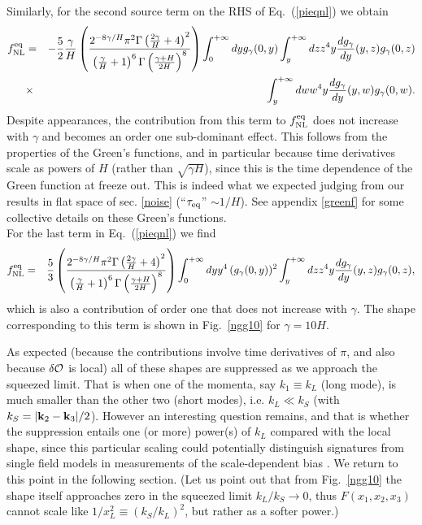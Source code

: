 \documentclass[11pt,amsmath,floats,floatfix,nofootinbib,secnumarabic, superscriptaddress, tightenlines]{revtex4}
\newcommand{\lp}{\left(}
\newcommand{\rp}{\right)}
\begin{document}
{Similarly, for the second source term on the RHS of Eq.~(\ref{pieqnl}) we obtain
\begin{eqnarray}
f_{\rm NL}^{\rm eq}&=&-\frac{5}{2}\frac{\gamma}{H}\left(\frac{2^{-8\gamma/H}\pi^2 {\Gamma\left(\frac{2\gamma}{H}+4\right)}^2}{\lp\frac{\gamma}{H}+1\rp^6{\Gamma\lp\frac{\gamma+H}{2 H}\rp}^8}\right)
 \int_{0}^{+\infty} dy  g_{\gamma}(0, y)\int_{y}^{+\infty} dz z^4  y\frac{d g_{\gamma}}{dy}( y,z)g_{\gamma}(0, z) \nonumber\\
&\times&\int_{y}^{+\infty} dw w^4  y\frac{dg_{\gamma}}{dy}(y,w)g_{\gamma}(0, w).\label{fnlgoonolocdot1}
\end{eqnarray} Despite appearances, the contribution from this term
to $f_{\rm NL}^{\rm eq}$ does not increase with $\gamma$ and becomes an order one sub-dominant effect. This follows from the properties of the Green's functions, and in particular because time derivatives scale as powers of $H$ (rather than $\sqrt{\gamma H}$), since this is the time dependence of the Green function at freeze out. This is indeed what we expected judging from our results in flat space of sec. \ref{noise} (``$\tau_{\rm eq}$'' $\sim 1/H$). See appendix \ref{greenf} for some collective details on these Green's functions.\\

For the last term in Eq.~(\ref{pieqnl}) we find
\begin{eqnarray}\label{fnlOdotpi}
f_{\rm NL}^{\rm eq}&=&\frac{5}{3}\left(\frac{2^{-8\gamma/H}\pi^2 {\Gamma\left(\frac{2\gamma}{H}+4\right)}^2}{\lp\frac{\gamma}{H}+1\rp^6{\Gamma\lp\frac{\gamma+H}{2 H}\rp}^8}\right)
 \int_{0}^{+\infty} dy  y^4\, (g_{\gamma}(0, y))^2\int_{y}^{+\infty} dz z^4  y\frac{d g_{\gamma}}{dy}(y,z)g_{\gamma}(0, z),\label{fnlgoonolocdot2}
\end{eqnarray} which is also a contribution of order one that does not increase with $\gamma$. The shape corresponding to this term
is shown in Fig.~\ref{ngg10} for $\gamma=10 H$.

As expected (because the contributions involve time derivatives of $\pi$, and also because $\delta{\cal O}$ is local) all of these shapes are suppressed as we approach the squeezed limit. That is when one of the momenta, say $k_1\equiv k_L$ (long mode), is much smaller than the other two (short modes), i.e. $k_L \ll k_S$ (with $k_S=|{\bf k}_2-{\bf k}_3|/2$). However an interesting question remains, and that is whether the suppression entails one (or more) power(s) of $k_L$ compared with the local shape, since this particular scaling could potentially distinguish signatures from single field models in measurements of the scale-dependent bias \cite{creminelli11}. We return to this point in the following section. (Let us point out that from Fig.~\ref{ngg10} the shape itself approaches zero in the squeezed limit $k_L/k_S\to 0$, thus  $F(x_1,x_2,x_3)$ cannot scale like $1/x_L^2\equiv (k_S/k_L)^2$, but rather as a softer power.)

}
\end{document}
